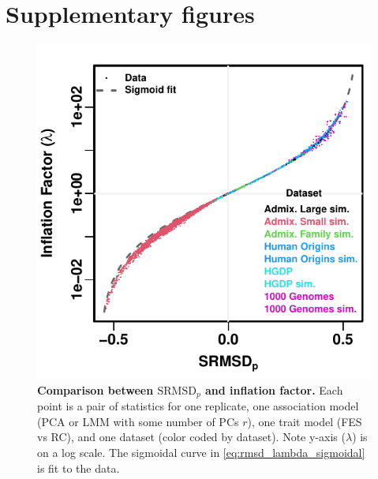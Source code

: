\documentclass[11pt]{article}
\newcommand{\rmsd}{\text{SRMSD}_p}
\newcommand{\beginsupplement}{%
  \setcounter{table}{0}
  \renewcommand{\thetable}{S\arabic{table}}%
  \setcounter{figure}{0}
  \renewcommand{\thefigure}{S\arabic{figure}}%
  \setcounter{section}{0}
  \renewcommand{\thesection}{S\arabic{section}}%
  \setcounter{equation}{0}
  \renewcommand{\theequation}{S\arabic{equation}}%
  \setcounter{page}{1}
  \renewcommand{\thepage}{S\arabic{page}}%
}
\begin{document}

\clearpage

\beginsupplement

\section{Supplementary figures}

\begin{figure}[hp!]
  \centering
  \includegraphics{sum-rmsd-vs-lambda.pdf}
  \caption{
    {\bf Comparison between $\rmsd$ and inflation factor.}
    Each point is a pair of statistics for one replicate, one association model (PCA or LMM with some number of PCs $r$), one trait model (FES vs RC), and one dataset (color coded by dataset).
    Note y-axis ($\lambda$) is on a log scale.
    The sigmoidal curve in \cref{eq:rmsd_lambda_sigmoidal} is fit to the data.
  }
  \label{fig:rmsd_lambda}
\end{figure}
\end{document}
